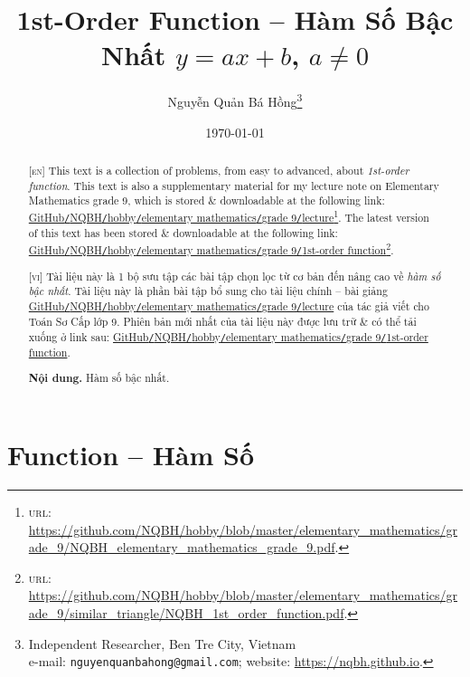\documentclass{article}
\title{1st-Order Function -- Hàm Số Bậc Nhất $y = ax + b$, $a\ne0$}
\author{Nguyễn Quản Bá Hồng\footnote{Independent Researcher, Ben Tre City, Vietnam\\e-mail: \texttt{nguyenquanbahong@gmail.com}; website: \url{https://nqbh.github.io}.}}
\date{\today}
\begin{document}
\maketitle
\begin{abstract}
	\textsc{[en]} This text is a collection of problems, from easy to advanced, about \textit{1st-order function}. This text is also a supplementary material for my lecture note on Elementary Mathematics grade 9, which is stored \& downloadable at the following link: \href{https://github.com/NQBH/hobby/blob/master/elementary_mathematics/grade_9/NQBH_elementary_mathematics_grade_9.pdf}{GitHub\texttt{/}NQBH\texttt{/}hobby\texttt{/}elementary mathematics\texttt{/}grade 9\texttt{/}lecture}\footnote{\textsc{url}: \url{https://github.com/NQBH/hobby/blob/master/elementary_mathematics/grade_9/NQBH_elementary_mathematics_grade_9.pdf}.}. The latest version of this text has been stored \& downloadable at the following link: \href{https://github.com/NQBH/hobby/blob/master/elementary_mathematics/grade_9/1st_order_function/NQBH_1st_order_function.pdf}{GitHub\texttt{/}NQBH\texttt{/}hobby\texttt{/}elementary mathematics\texttt{/}grade 9\texttt{/}1st-order function}\footnote{\textsc{url}: \url{https://github.com/NQBH/hobby/blob/master/elementary_mathematics/grade_9/similar_triangle/NQBH_1st_order_function.pdf}.}.
	\vspace{2mm}
	
	\textsc{[vi]} Tài liệu này là 1 bộ sưu tập các bài tập chọn lọc từ cơ bản đến nâng cao về \textit{hàm số bậc nhất}. Tài liệu này là phần bài tập bổ sung cho tài liệu chính -- bài giảng \href{https://github.com/NQBH/hobby/blob/master/elementary_mathematics/grade_9/NQBH_elementary_mathematics_grade_9.pdf}{GitHub\texttt{/}NQBH\texttt{/}hobby\texttt{/}elementary mathematics\texttt{/}grade 9\texttt{/}lecture} của tác giả viết cho Toán Sơ Cấp lớp 9. Phiên bản mới nhất của tài liệu này được lưu trữ \& có thể tải xuống ở link sau: \href{https://github.com/NQBH/hobby/blob/master/elementary_mathematics/grade_9/1st_order_function/NQBH_1st_order_function.pdf}{GitHub\texttt{/}NQBH\texttt{/}hobby\texttt{/}elementary mathematics\texttt{/}grade 9\texttt{/}1st-order function}.
	
	\textsf{\textbf{Nội dung.} Hàm số bậc nhất.}
\end{abstract}
\tableofcontents
\newpage


\section{Function -- Hàm Số}
\end{document}
